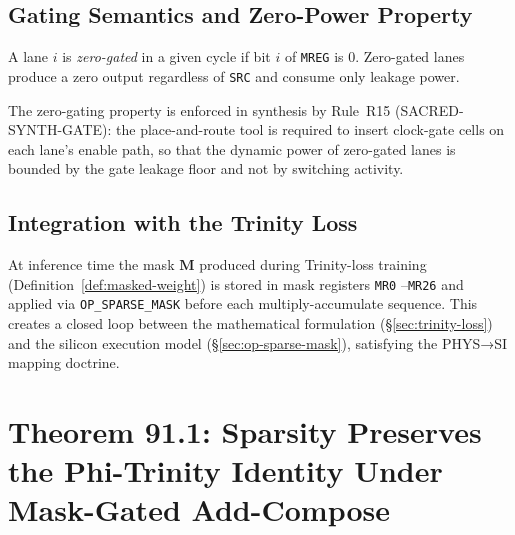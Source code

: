 \subsection{Gating Semantics and Zero-Power Property}
\label{subsec:gating}

\begin{definition}
\label{def:zero-gated}
A lane $i$ is \emph{zero-gated} in a given cycle if bit $i$ of \texttt{MREG}
is $0$.  Zero-gated lanes produce a zero output regardless of \texttt{SRC} and
consume only leakage power.
\end{definition}

The zero-gating property is enforced in synthesis by Rule~R15
(SACRED-SYNTH-GATE): the place-and-route tool is required to insert clock-gate
cells on each lane's enable path, so that the dynamic power of zero-gated lanes
is bounded by the gate leakage floor and not by switching activity.

\subsection{Integration with the Trinity Loss}
\label{subsec:isa-integration}

At inference time the mask $\mathbf{M}$ produced during Trinity-loss training
(Definition~\ref{def:masked-weight}) is stored in mask registers \texttt{MR0}
--\texttt{MR26} and applied via \texttt{OP\_SPARSE\_MASK} before each
multiply-accumulate sequence.  This creates a closed loop between the
mathematical formulation (§\ref{sec:trinity-loss}) and the silicon execution
model (§\ref{sec:op-sparse-mask}), satisfying the PHYS→SI mapping doctrine.


\section{Theorem 91.1: Sparsity Preserves the Phi-Trinity Identity Under Mask-Gated Add-Compose}
\label{sec:thm1}

